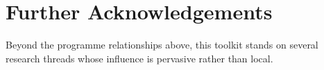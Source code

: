 \par
\begingroup
\let\clearpage\relax
\let\cleardoublepage\relax
\vspace{2\baselineskip}
\chapter*{Further Acknowledgements}
\endgroup
{}

\noindent Beyond the programme relationships above, this toolkit stands on
several research threads whose influence is pervasive rather than local.

\newpage
\begin{itemize}



\end{itemize}
